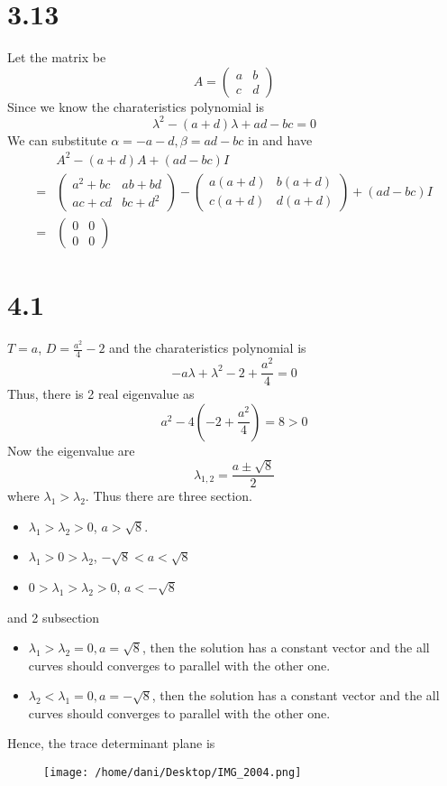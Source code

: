 \documentclass[11pt]{article}
\theoremstyle{mystyle}
\theoremstyle{definition}
\begin{document}
\section*{3.13}
Let the matrix be 
\[
  A = 
  \begin{pmatrix}
    a & b \\
    c & d 
  \end{pmatrix}
\]
Since we know the charateristics polynomial is 
\[
  \lambda^2 - (a+d) \lambda + ad - bc = 0
\]
We can substitute $\alpha = -a-d, \beta = ad-bc$ in and have 
\begin{align*}
  &A^2 - (a+d)A + (ad-bc)I \\
  =& 
  \begin{pmatrix}
    a^2 +bc & ab + bd \\
    ac + cd & bc + d^2
  \end{pmatrix}
  - 
  \begin{pmatrix}
    a(a+d) & b(a+d) \\
    c(a+d) & d(a+d) 
  \end{pmatrix}
  +
  (ad-bc)I \\
  =&
  \begin{pmatrix}
    0 & 0 \\
    0 & 0
  \end{pmatrix}
\end{align*}
\clearpage 
\section*{4.1}
$T = a$, $D = \displaystyle\frac{a^2}{4} - 2$ and the charateristics polynomial is 
\[
  -a\lambda + \lambda^2 - 2 + \displaystyle\frac{a^2}{4} = 0
\]
Thus, there is 2 real eigenvalue as 
\[
  a^2 - 4\left(-2 + \displaystyle\frac{a^2}{4}\right) = 8 > 0  
\]
Now the eigenvalue are 
\[
  \lambda_{1,2} = \displaystyle\frac{a \pm \sqrt{8}}{2}
\]
where $\lambda_1 > \lambda_2$. Thus there are three section. 
\begin{itemize}
  \item $\lambda_1 > \lambda_2 > 0$, $a > \sqrt{8}$. 
  \item $\lambda_1 >0 > \lambda_2 $, $-\sqrt{8} < a < \sqrt{8}$ 
  \item $0 > \lambda_1 > \lambda_2 > 0$, $a < -\sqrt{8}$
\end{itemize}
and 2 subsection 
\begin{itemize}
  \item $\lambda_1 > \lambda_2 = 0, a = \sqrt{8}$, then the solution has a constant vector and the all curves should converges to parallel with the other one.
  \item $\lambda_2 < \lambda_1 = 0, a = -\sqrt{8}$, then the solution has a constant vector and the all curves should converges to parallel with the other one.
\end{itemize}
Hence, the trace determinant plane is 
\begin{figure}[h]
  \centering
  \texttt{[image: /home/dani/Desktop/IMG\_2004.png]}
  \caption{}
  \label{fig:img_2004}
\end{figure}
\clearpage 
\end{document}
